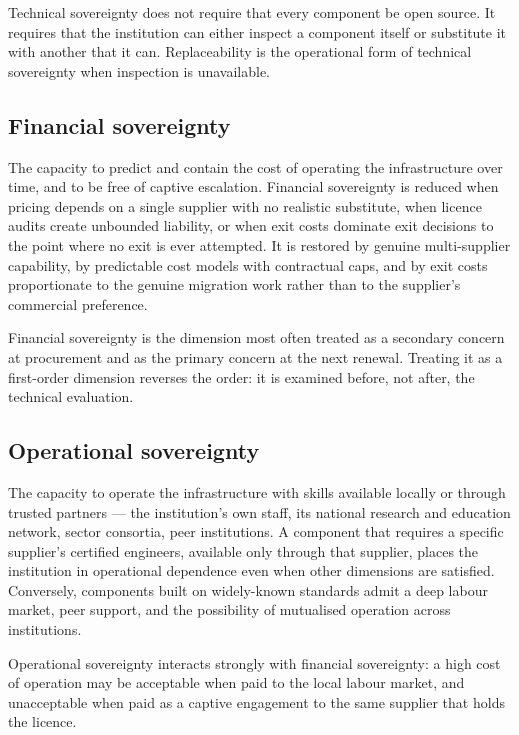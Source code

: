 Technical sovereignty does not require that every component be open
source. It requires that the institution can either inspect a component
itself or substitute it with another that it can. Replaceability is
the operational form of technical sovereignty when inspection is
unavailable.

\subsection{Financial sovereignty}
\label{sec:sg-financial}

The capacity to predict and contain the cost of operating the
infrastructure over time, and to be free of captive escalation.
Financial sovereignty is reduced when pricing depends on a single
supplier with no realistic substitute, when licence audits create
unbounded liability, or when exit costs dominate exit decisions to the
point where no exit is ever attempted. It is restored by genuine
multi-supplier capability, by predictable cost models with contractual
caps, and by exit costs proportionate to the genuine migration work
rather than to the supplier's commercial preference.

Financial sovereignty is the dimension most often treated as a
secondary concern at procurement and as the primary concern at the
next renewal. Treating it as a first-order dimension reverses the
order: it is examined before, not after, the technical evaluation.

\subsection{Operational sovereignty}
\label{sec:sg-operational}

The capacity to operate the infrastructure with skills available
locally or through trusted partners --- the institution's own staff,
its national research and education network, sector consortia, peer
institutions. A component that requires a specific supplier's certified
engineers, available only through that supplier, places the institution
in operational dependence even when other dimensions are satisfied.
Conversely, components built on widely-known standards admit a deep
labour market, peer support, and the possibility of mutualised operation
across institutions.

Operational sovereignty interacts strongly with financial sovereignty:
a high cost of operation may be acceptable when paid to the local
labour market, and unacceptable when paid as a captive engagement to
the same supplier that holds the licence.

